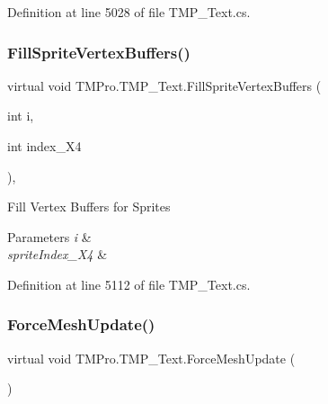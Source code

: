 Definition at line 5028 of file T\+M\+P\+\_\+\+Text.\+cs.

\mbox{\label{class_t_m_pro_1_1_t_m_p___text_a6f919375c12a3e03f3ded228043e9513}} 
\subsubsection{\texorpdfstring{FillSpriteVertexBuffers()}{FillSpriteVertexBuffers()}}
{\footnotesize\ttfamily virtual void T\+M\+Pro.\+T\+M\+P\+\_\+\+Text.\+Fill\+Sprite\+Vertex\+Buffers (\begin{DoxyParamCaption}\item[{int}]{i,  }\item[{int}]{index\+\_\+\+X4 }\end{DoxyParamCaption})\hspace{0.3cm}{\ttfamily [protected]}, {\ttfamily [virtual]}}



Fill Vertex Buffers for Sprites 


\begin{DoxyParams}{Parameters}
{\em i} & \\
\hline
{\em sprite\+Index\+\_\+\+X4} & \\
\hline
\end{DoxyParams}


Definition at line 5112 of file T\+M\+P\+\_\+\+Text.\+cs.

\mbox{\label{class_t_m_pro_1_1_t_m_p___text_a93c463ff2bb3b846a468f3d1764bdef4}} 
\subsubsection{\texorpdfstring{ForceMeshUpdate()}{ForceMeshUpdate()}\hspace{0.1cm}{\footnotesize\ttfamily [1/2]}}
{\footnotesize\ttfamily virtual void T\+M\+Pro.\+T\+M\+P\+\_\+\+Text.\+Force\+Mesh\+Update (\begin{DoxyParamCaption}{ }\end{DoxyParamCaption})\hspace{0.3cm}{\ttfamily [virtual]}}



